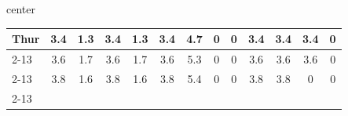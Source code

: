 \documentclass{article}
\begin{document}
\begin{adjustbox}{center}
\begin{tabular}{lcccccccccccc}
	\multicolumn{1}{l|}{{ Thur}}                                      & \multicolumn{1}{c|}{{ 3.4}}                                  & \multicolumn{1}{c|}{{ 1.3}}                                   & \multicolumn{1}{c|}{{ 3.4}}                                  & \multicolumn{1}{c|}{{ 1.3}}                                   & \multicolumn{1}{c|}{{ 3.4}}                                  & \multicolumn{1}{c|}{{ 4.7}}                                   & \multicolumn{1}{c|}{{ 0}}                                    & \multicolumn{1}{c|}{{ 0}}                                     & \multicolumn{1}{c|}{{ 3.4}}                                  & \multicolumn{1}{c|}{{ 3.4}}                                   & \multicolumn{1}{c|}{{ 3.4}}                                  & \multicolumn{1}{c|}{{ 0}}                                     \\ \cline{2-13} 
	\multicolumn{1}{l|}{{ Fri}}                                       & \multicolumn{1}{c|}{{ 3.6}}                                  & \multicolumn{1}{c|}{{ 1.7}}                                   & \multicolumn{1}{c|}{{ 3.6}}                                  & \multicolumn{1}{c|}{{ 1.7}}                                   & \multicolumn{1}{c|}{{ 3.6}}                                  & \multicolumn{1}{c|}{{ 5.3}}                                   & \multicolumn{1}{c|}{{ 0}}                                    & \multicolumn{1}{c|}{{ 0}}                                     & \multicolumn{1}{c|}{{ 3.6}}                                  & \multicolumn{1}{c|}{{ 3.6}}                                   & \multicolumn{1}{c|}{{ 3.6}}                                  & \multicolumn{1}{c|}{{ 0}}                                     \\ \cline{2-13} 
	\multicolumn{1}{l|}{{ Sat}}                                       & \multicolumn{1}{c|}{{ 3.8}}                                  & \multicolumn{1}{c|}{{ 1.6}}                                   & \multicolumn{1}{c|}{{ 3.8}}                                  & \multicolumn{1}{c|}{{ 1.6}}                                   & \multicolumn{1}{c|}{{ 3.8}}                                  & \multicolumn{1}{c|}{{ 5.4}}                                   & \multicolumn{1}{c|}{{ 0}}                                    & \multicolumn{1}{c|}{{ 0}}                                     & \multicolumn{1}{c|}{{ 3.8}}                                  & \multicolumn{1}{c|}{{ 3.8}}                                   & \multicolumn{1}{c|}{{ 0}}                                    & \multicolumn{1}{c|}{{ 0}}                                     \\ \cline{2-13} 

\end{tabular}
\end{adjustbox}
\end{document}
